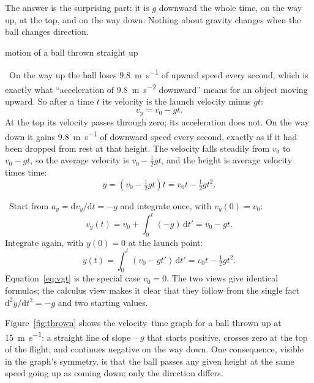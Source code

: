 \documentclass[11pt,twoside,openany]{book}
\newcommand{\dd}{\mathrm{d}}
\newcommand{\viewtag}[3]{\fcolorbox{#2}{#3}{\footnotesize\textbf{\textcolor{#2}{#1}}}}
\newcommand{\elemtag}{\viewtag{Elementary}{elemcol}{elempale}}
\newcommand{\calctag}{\viewtag{Calculus}{calccol}{calcpale}}
\newcommand{\elem}{\par\medskip\noindent\elemtag\ }
\newcommand{\calc}{\par\medskip\noindent\calctag\ }
\begin{document}
The answer is the surprising part: it is $g$ downward the whole time, on the way up, at the top, and on the way down. Nothing about gravity changes when the ball changes direction.

\begin{twoviews}{motion of a ball thrown straight up}
\elem On the way up the ball loses \SI{9.8}{\metre\per\second} of upward speed every second, which is exactly what ``acceleration of \SI{9.8}{\metre\per\second\squared} downward'' means for an object moving upward. So after a time $t$ its velocity is the launch velocity minus $gt$:
\[
v_y = v_0 - g t.
\]
At the top its velocity passes through zero; its acceleration does not. On the way down it gains \SI{9.8}{\metre\per\second} of downward speed every second, exactly as if it had been dropped from rest at that height. The velocity falls steadily from $v_0$ to $v_0 - gt$, so the average velocity is $v_0 - \tfrac12 gt$, and the height is average velocity times time:
\[
y = \left(v_0 - \tfrac12 g t\right) t = v_0 t - \tfrac12 g t^2.
\]

\calc Start from $a_y = \dd v_y/\dd t = -g$ and integrate once, with $v_y(0) = v_0$:
\begin{equation}
v_y(t) = v_0 + \int_0^t (-g)\,\dd t' = v_0 - g t.
\label{eq:thrown}
\end{equation}
Integrate again, with $y(0) = 0$ at the launch point:
\begin{equation}
y(t) = \int_0^t (v_0 - g t')\,\dd t' = v_0 t - \tfrac12 g t^2.
\label{eq:thrown2}
\end{equation}
Equation~\eqref{eq:vgt} is the special case $v_0 = 0$. The two views give identical formulas; the calculus view makes it clear that they follow from the single fact $\dd^2 y/\dd t^2 = -g$ and two starting values.
\end{twoviews}

Figure~\ref{fig:thrown} shows the velocity--time graph for a ball thrown up at \SI{15}{\metre\per\second}: a straight line of slope $-g$ that starts positive, crosses zero at the top of the flight, and continues negative on the way down. One consequence, visible in the graph's symmetry, is that the ball passes any given height at the same speed going up as coming down; only the direction differs.
\end{document}
